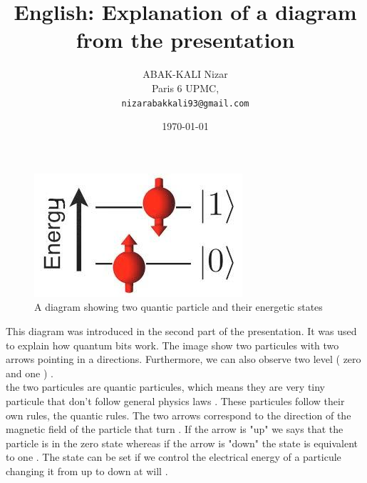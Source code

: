 \documentclass[a4paper,12pt,final]{article}
\title{English: Explanation of a diagram from the presentation}
\author{ABAK-KALI Nizar\\
   Paris 6 UPMC,\\
   \texttt{nizarabakkali93@gmail.com}}
\date{\today}
\begin{document}
\maketitle
\newpage

\begin{figure}[t]
	  \includegraphics[scale=1.0]{figures/qspin_.png}
	 \caption{A diagram showing two quantic particle and their energetic states}
 
\end{figure}

This diagram was introduced in the second part of the presentation. It was used to explain how quantum bits work. The image show two particules with two arrows pointing in a directions. Furthermore, we can also observe two level ( zero and one ) . \\
the two particules are quantic particules, which means they are very tiny particule that don't follow general physics laws . These particules follow their own rules, the quantic rules. The two arrows correspond to the direction of the magnetic field of the particle that turn . If the arrow is "up" we says that the particle is in the zero state whereas if the arrow is "down" the state is equivalent to one . The state can be set if we control the electrical energy of a particule changing it from up to down at will .
\end{document}
